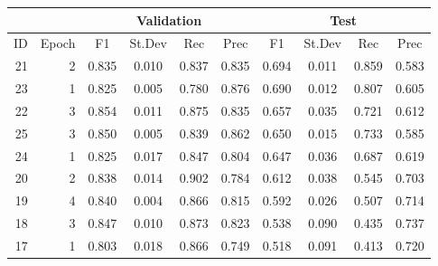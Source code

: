 \begin{tabular}{rr|cccc|cccc}
  \hline
          &        &             \multicolumn{4}{c|}{Validation}   & \multicolumn{4}{c}{Test} \\
  \hline
       ID &  Epoch &       F1 &      St.Dev &      Rec &      Prec &       F1 &       St.Dev &  Rec      &       Prec \\
  \hline
 21 &      2 &   0.835 &          0.010 &    0.837 &     0.835 &    0.694 &           0.011 &     0.859 &      0.583 \\
 23 &      1 &   0.825 &          0.005 &    0.780 &     0.876 &    0.690 &           0.012 &     0.807 &      0.605 \\
 22 &      3 &   0.854 &          0.011 &    0.875 &     0.835 &    0.657 &           0.035 &     0.721 &      0.612 \\
 25 &      3 &   0.850 &          0.005 &    0.839 &     0.862 &    0.650 &           0.015 &     0.733 &      0.585 \\
 24 &      1 &   0.825 &          0.017 &    0.847 &     0.804 &    0.647 &           0.036 &     0.687 &      0.619 \\
 20 &      2 &   0.838 &          0.014 &    0.902 &     0.784 &    0.612 &           0.038 &     0.545 &      0.703 \\
 19 &      4 &   0.840 &          0.004 &    0.866 &     0.815 &    0.592 &           0.026 &     0.507 &      0.714 \\
 18 &      3 &   0.847 &          0.010 &    0.873 &     0.823 &    0.538 &           0.090 &     0.435 &      0.737 \\
 17 &      1 &   0.803 &          0.018 &    0.866 &     0.749 &    0.518 &           0.091 &     0.413 &      0.720 \\
  \hline
\end{tabular}
